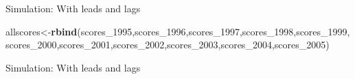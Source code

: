 \documentclass[
  ignorenonframetext,
]{beamer}
\newenvironment{Shaded}{\begin{snugshade}}{\end{snugshade}}
\newcommand{\DataTypeTok}[1]{\textcolor[rgb]{0.13,0.29,0.53}{#1}}
\newcommand{\DecValTok}[1]{\textcolor[rgb]{0.00,0.00,0.81}{#1}}
\newcommand{\KeywordTok}[1]{\textcolor[rgb]{0.13,0.29,0.53}{\textbf{#1}}}
\newcommand{\NormalTok}[1]{#1}
\newcommand{\OperatorTok}[1]{\textcolor[rgb]{0.81,0.36,0.00}{\textbf{#1}}}
\newcommand{\StringTok}[1]{\textcolor[rgb]{0.31,0.60,0.02}{#1}}
\begin{document}
\begin{frame}[fragile]{Simulation: With leads and lags}
\begin{Shaded}
\begin{Highlighting}[]
\NormalTok{allscores\textless{}{-}}\KeywordTok{rbind}\NormalTok{(scores\_}\DecValTok{1995}\NormalTok{,scores\_}\DecValTok{1996}\NormalTok{,scores\_}\DecValTok{1997}\NormalTok{,scores\_}\DecValTok{1998}\NormalTok{,scores\_}\DecValTok{1999}\NormalTok{,}
\NormalTok{                 scores\_}\DecValTok{2000}\NormalTok{,scores\_}\DecValTok{2001}\NormalTok{,scores\_}\DecValTok{2002}\NormalTok{,scores\_}\DecValTok{2003}\NormalTok{,scores\_}\DecValTok{2004}\NormalTok{,scores\_}\DecValTok{2005}\NormalTok{)}
\end{Highlighting}
\end{Shaded}
\end{frame}

\begin{frame}[fragile]{Simulation: With leads and lags}
\protect\hypertarget{simulation-with-leads-and-lags-2}{}
\tiny

\begin{Shaded}
\end{Shaded}
\end{frame}
\end{document}
